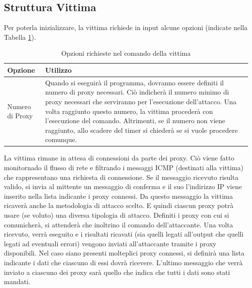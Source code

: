 \subsection{Struttura Vittima} 
Per poterla inizializzare, la vittima richiede in input alcune opzioni
(indicate nella Tabella \ref{table:comunicazione:vittima:opzioni}). 
\begin{longtable}{|p{}|p{}|} 
\caption{Opzioni richieste nel comando della vittima} 
\label{table:comunicazione:vittima:opzioni} \\
    \hline 
    \textbf{Opzione} & \textbf{Utilizzo}  \\
    \hline 
    Numero di Proxy & 
    Quando si eseguirà il programma, dovranno essere definiti il numero di proxy necessari. 
    Ciò indicherà il numero minimo di proxy necessari che serviranno per l'esecuzione dell'attacco. 
    Una volta raggiunto questo numero, la vittima procederà con l'esecuzione del comando. 
    Altrimenti, se il numero non viene raggiunto, allo scadere del timer si chiederà se si vuole procedere comunque. 
    \\ 
    \hline  
\end{longtable} 
La vittima rimane in attesa di connessioni da parte dei proxy.
Ciò viene fatto monitornado il flusso di rete e filtrando i messaggi ICMP 
(destinati alla vittima) che rappresentano una richiesta di connessione. 
Se il messaggio ricevuto risulta valido, si invia al mittente un messaggio 
di conferma e il suo l'indirizzo IP viene inserito nella lista indicante i proxy connessi.
Da questo messaggio la vittima ricaverà anche la metodologia di attacco scelto. 
E quindi ciascun proxy potrà usare (se voluto) una diversa tipologia di attacco. 
\vspace{1ex} \newline 
Definiti i proxy con cui si comunicherà, si attenderà che inoltrino il comando dell'attaccante. 
Una volta ricevuto, verrà eseguito e i risultati ricavati (sia quelli legati all'output che quelli legati ad 
eventuali errori) vengono inviati all'attaccante tramite i proxy disponibili. 
Nel caso siano presenti molteplici proxy connessi, si definirà una lista indicante i dati che ciascuno di essi dovrà ricevere. 
L'ultimo messaggio che verrà inviato a ciascuno dei proxy sarà quello che indica che tutti i dati sono stati mandati. 
